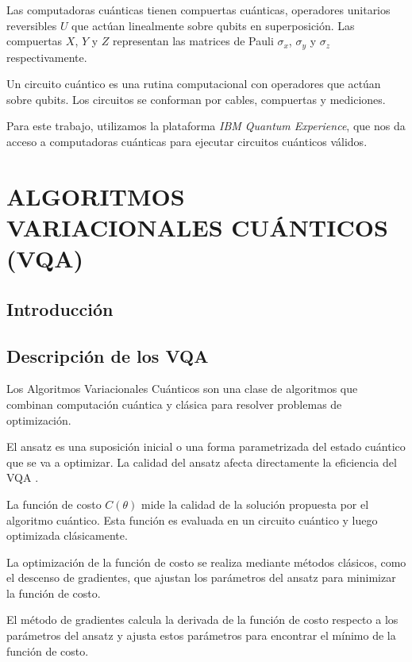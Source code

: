 \documentclass[letterpaper,12pt]{thesisECFM}
\theoremstyle{plain}
\theoremstyle{definition}
\theoremstyle{remark}
\newcommand{\1}{\mathbb{1}}
\begin{document}
Las computadoras cuánticas tienen compuertas cuánticas, operadores unitarios reversibles $U$ que actúan linealmente sobre qubits en superposición. Las compuertas $X$, $Y$ y $Z$ representan las matrices de Pauli $\sigma_x$, $\sigma_y$ y $\sigma_z$ respectivamente. \par 

Un circuito cuántico es una rutina computacional con operadores que actúan sobre qubits. Los circuitos se conforman por cables, compuertas y mediciones. \par 

Para este trabajo, utilizamos la plataforma \textit{IBM Quantum Experience}, que nos da acceso a computadoras cuánticas para ejecutar circuitos cuánticos válidos. \par  

\chapter{ALGORITMOS VARIACIONALES CUÁNTICOS (VQA)}
\section{Introducción}
\section{Descripción de los VQA}
Los Algoritmos Variacionales Cuánticos son una clase de algoritmos que combinan computación cuántica y clásica para resolver problemas de optimización. \par 

El ansatz es una suposición inicial o una forma parametrizada del estado cuántico que se va a optimizar. La calidad del ansatz afecta directamente la eficiencia del VQA . \par 

La función de costo $C(\theta)$ mide la calidad de la solución propuesta por el algoritmo cuántico. Esta función es evaluada en un circuito cuántico y luego optimizada clásicamente. \par 

La optimización de la función de costo se realiza mediante métodos clásicos, como el descenso de gradientes, que ajustan los parámetros del ansatz para minimizar la función de costo. \par 
 
El método de gradientes calcula la derivada de la función de costo respecto a los parámetros del ansatz y ajusta estos parámetros para encontrar el mínimo de la función de costo. \par 
\end{document}
